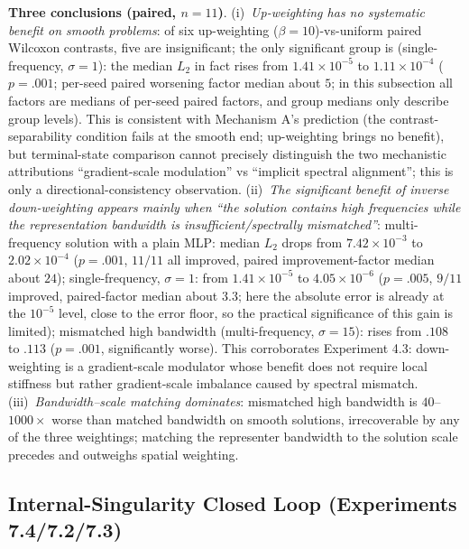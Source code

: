 \documentclass[11pt]{article}
\numberwithin{equation}{section}
\begin{document}
\noindent\textbf{Three conclusions (paired, $n=11$)}.
(i)~\emph{Up-weighting has no systematic benefit on smooth problems}: of six up-weighting ($\beta=10$)-vs-uniform paired Wilcoxon contrasts, five are insignificant; the only significant group is (single-frequency, $\sigma=1$): the median $L_2$ in fact rises from $1.41\times10^{-5}$ to $1.11\times10^{-4}$ ($p=.001$; per-seed paired worsening factor median about $5$; in this subsection all factors are medians of per-seed paired factors, and group medians only describe group levels). This is consistent with Mechanism A's prediction (the contrast-separability condition fails at the smooth end; up-weighting brings no benefit), but terminal-state comparison cannot precisely distinguish the two mechanistic attributions ``gradient-scale modulation'' vs ``implicit spectral alignment''; this is only a directional-consistency observation.
(ii)~\emph{The significant benefit of inverse down-weighting appears mainly when ``the solution contains high frequencies while the representation bandwidth is insufficient/spectrally mismatched''}: multi-frequency solution with a plain MLP: median $L_2$ drops from $7.42\times10^{-3}$ to $2.02\times10^{-4}$ ($p=.001$, $11/11$ all improved, paired improvement-factor median about $24$); single-frequency, $\sigma=1$: from $1.41\times10^{-5}$ to $4.05\times10^{-6}$ ($p=.005$, $9/11$ improved, paired-factor median about $3.3$; here the absolute error is already at the $10^{-5}$ level, close to the error floor, so the practical significance of this gain is limited); mismatched high bandwidth (multi-frequency, $\sigma=15$): rises from $.108$ to $.113$ ($p=.001$, significantly worse). This corroborates Experiment 4.3: down-weighting is a gradient-scale modulator whose benefit does not require local stiffness but rather gradient-scale imbalance caused by spectral mismatch.
(iii)~\emph{Bandwidth--scale matching dominates}: mismatched high bandwidth is $40$--$1000\times$ worse than matched bandwidth on smooth solutions, irrecoverable by any of the three weightings; matching the representer bandwidth to the solution scale precedes and outweighs spatial weighting.

\subsection{Internal-Singularity Closed Loop (Experiments 7.4/7.2/7.3)}\label{sec:s2singular}
\end{document}
